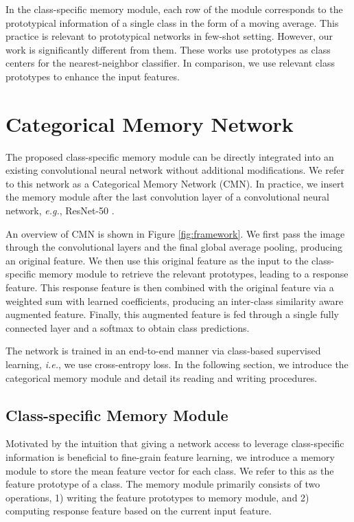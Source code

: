 \documentclass[journal]{IEEEtran}
\begin{document}
In the class-specific memory module, each row of the module corresponds to the prototypical information of a single class in the form of a moving average. This practice is relevant to prototypical networks \cite{hsu2018unsupervised,snell2017prototypical,wertheimer2019few} in few-shot setting. However, our work is significantly different from them. These works use  prototypes as class centers for the nearest-neighbor classifier. In comparison, we use relevant class prototypes to enhance the input features.


\section{Categorical Memory Network}
The proposed class-specific memory module can be directly integrated into an existing convolutional neural network without additional modifications. We refer to this network as a Categorical Memory Network (CMN). In practice, we insert the memory module after the last convolution layer of a convolutional neural network, \emph{e.g.}, ResNet-50 \cite{he2016deep}. 

An overview of CMN is shown in Figure \ref{fig:framework}.
We first pass the image through the convolutional layers and the final global average pooling, producing an original feature.
We then use this original feature as the input to the class-specific memory module to retrieve the relevant prototypes, leading to a response feature.
This response feature is then combined with the original feature via a weighted sum with learned coefficients, producing an inter-class similarity aware augmented feature.
Finally, this augmented feature is fed through a single fully connected layer and a softmax to obtain class predictions.

The network is trained in an end-to-end manner via class-based supervised learning, \emph{i.e.}, we use cross-entropy loss.
In the following section, we introduce the categorical memory module and detail its reading and writing procedures.


\subsection{Class-specific Memory Module}
Motivated by the intuition that giving a network access to leverage class-specific information is beneficial to fine-grain feature learning, we introduce a memory module to store the mean feature vector for each class. We refer to this as the feature prototype of a class. The memory module primarily consists of two operations, 1) writing the feature prototypes to memory module, and 2) computing response feature based on the current input feature. 
\end{document}
